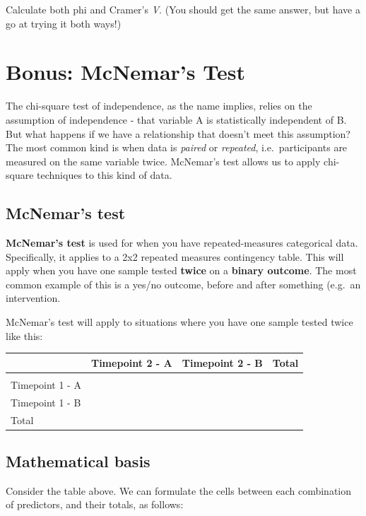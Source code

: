 \documentclass[
]{book}
\begin{document}
Calculate both phi and Cramer's \emph{V}. (You should get the same answer, but have a go at trying it both ways!)

\hypertarget{bonus-mcnemars-test}{%
\section{Bonus: McNemar's Test}\label{bonus-mcnemars-test}}

The chi-square test of independence, as the name implies, relies on the assumption of independence - that variable A is statistically independent of B. But what happens if we have a relationship that doesn't meet this assumption? The most common kind is when data is \emph{paired} or \emph{repeated}, i.e.~participants are measured on the same variable twice. McNemar's test allows us to apply chi-square techniques to this kind of data.

\hypertarget{mcnemars-test}{%
\subsection{McNemar's test}\label{mcnemars-test}}

\textbf{McNemar's test} is used for when you have repeated-measures categorical data. Specifically, it applies to a 2x2 repeated measures contingency table. This will apply when you have one sample tested \textbf{twice} on a \textbf{binary outcome}. The most common example of this is a yes/no outcome, before and after something (e.g.~an intervention.

McNemar's test will apply to situations where you have one sample tested twice like this:

\begin{tabular}{l|l|l|l}
\hline
 & Timepoint 2 - A & Timepoint 2 - B & Total\\
\hline
 &  &  & \\
\hline
Timepoint 1 - A &  &  & \\
\hline
Timepoint 1 - B &  &  & \\
\hline
Total &  &  & \\
\hline
\end{tabular}

\hypertarget{mathematical-basis}{%
\subsection{Mathematical basis}\label{mathematical-basis}}

Consider the table above. We can formulate the cells between each combination of predictors, and their totals, as follows:
\end{document}
